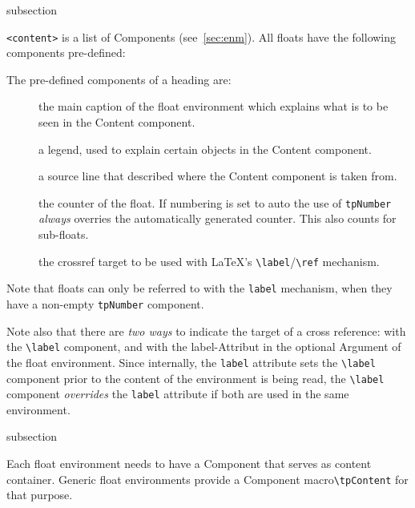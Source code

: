 \begin{heading}[label=sec:flt:comp]{subsection}
\end{heading}

\lstinline{<content>} is a list of Components (see~\ref{sec:enm}). All
floats have the following components pre-defined:

The pre-defined components of a heading are:
\begin{description}
\item[\string\tpCaption]
  the main caption of the float environment which explains what is to
  be seen in the Content component.
\item[\string\tpLegend]
  a legend, used to explain certain objects in the Content component.
\item[\string\tpSource]
  a source line that described where the Content component is taken from.
\item[\string\tpNumber]
  the counter of the float. If numbering is set to auto the use of
  \lstinline{tpNumber} \textit{always} overries the automatically
  generated counter. This also counts for sub-floats.
\item[\string\label]
  the crossref target to be used with \LaTeX's
  \lstinline{\label}/\lstinline{\ref} mechanism.
\end{description}
Note that floats can only be referred to with the \lstinline{label}
mechanism, when they have a non-empty \lstinline{tpNumber} component.

Note also that there are \textit{two ways} to indicate the target of a
cross reference: with the \lstinline{\label} component, and with the
label-Attribut in the optional Argument of the float
environment. Since internally, the \lstinline{label} attribute sets
the \lstinline{\label} component prior to the content of the
environment is being read, the \lstinline{\label} component
\textit{overrides} the \lstinline{label} attribute if both are used in
the same environment.


\begin{heading}[label=sec:flt:content]{subsection}
\end{heading}

Each float environment needs to have a Component that serves as
content container. Generic float environments provide a Component
macro\lstinline{\tpContent}%
 for that
purpose.

